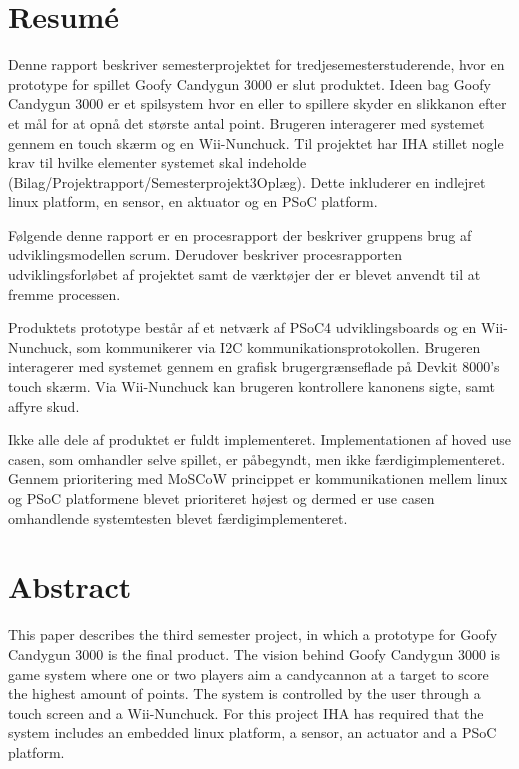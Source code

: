 \chapter{Resumé}
Denne rapport beskriver semesterprojektet for tredjesemesterstuderende, hvor en prototype for spillet Goofy Candygun 3000 er slut produktet. Ideen bag Goofy Candygun 3000 er et spilsystem hvor en eller to spillere skyder en slikkanon efter et mål for at opnå det største antal point. Brugeren interagerer med systemet gennem en touch skærm og en Wii-Nunchuck. Til projektet har IHA stillet nogle krav til hvilke elementer systemet skal indeholde (Bilag/Projektrapport/Semesterprojekt3Oplæg). Dette inkluderer en indlejret linux platform, en sensor, en aktuator og en PSoC platform. \newline

\noindent Følgende denne rapport er en procesrapport der beskriver gruppens brug af udviklingsmodellen scrum\cite{scrum}. Derudover beskriver procesrapporten udviklingsforløbet af projektet samt de værktøjer der er blevet anvendt til at fremme processen. \newline

\noindent Produktets prototype består af et netværk af PSoC4 udviklingsboards og en Wii-Nunchuck, som kommunikerer via I2C kommunikationsprotokollen. Brugeren interagerer med systemet gennem en grafisk brugergrænseflade på Devkit 8000's touch skærm. Via Wii-Nunchuck kan brugeren kontrollere kanonens sigte, samt affyre skud. \newline

\noindent Ikke alle dele af produktet er fuldt implementeret. Implementationen af hoved use casen, som omhandler selve spillet, er påbegyndt, men ikke færdigimplementeret. Gennem prioritering med MoSCoW princippet \cite{moscow} er kommunikationen mellem linux og PSoC platformene blevet prioriteret højest og dermed er use casen omhandlende systemtesten blevet færdigimplementeret.

\chapter{Abstract}
This paper describes the third semester project, in which a prototype for Goofy Candygun 3000 is the final product. The vision behind Goofy Candygun 3000 is game system where one or two players aim a candycannon at a target to score the highest amount of points. The system is controlled by the user through a touch screen and a Wii-Nunchuck. For this project IHA has required that the system includes an embedded linux platform, a sensor, an actuator and a PSoC platform. \newline

